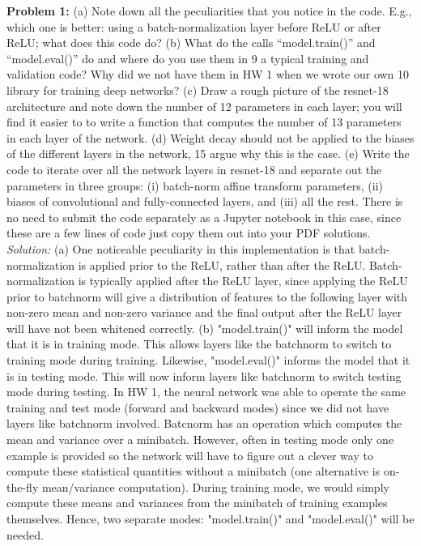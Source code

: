 \documentclass[12pt]{article}
\begin{document}
\maketitle


\textbf{Problem 1:}  \newline 
(a) Note down all the peculiarities that you notice in the code. E.g., which one is better: using a batch-normalization layer before ReLU or after ReLU; what does this code do? \newline 
(b) What do the calls “model.train()” and “model.eval()” do and where do you use them in 9 a typical training and validation code? Why did we not have them in HW 1 when we wrote our own 10 library for training deep networks? \newline 
(c) Draw a rough picture of the resnet-18 architecture and note down the number of 12 parameters in each layer; you will find it easier to to write a function that computes the number of 13 parameters in each layer of the network.\newline 
(d) Weight decay should not be applied to the biases of the different layers in the network, 15 argue why this is the case. \newline 
(e) Write the code to iterate over all the network layers in resnet-18 and separate out the  parameters in three groups: (i) batch-norm affine transform parameters, (ii) biases of convolutional and fully-connected layers, and (iii) all the rest. There is no need to submit the code separately as a Jupyter notebook in this case, since these are a few lines of code just copy them out into your PDF  solutions.
\newline \newline 
\emph{Solution: } \newline   \newline 
(a) One noticeable peculiarity in this implementation is that batch-normalization is applied prior to the ReLU, rather than after the ReLU.  Batch-normalization is typically applied after the ReLU layer, since applying the ReLU prior to batchnorm will give a distribution of features to the following layer with non-zero mean and non-zero variance and the final output after the ReLU layer will have not been whitened correctly.   \newline \newline 
(b) "model.train()" will inform the model that it is in training mode.  This allows layers like the batchnorm to switch to training mode during training. Likewise, "model.eval()"  informs the model that it is in testing mode. This will now inform layers like batchnorm to switch testing mode during testing. In HW 1, the neural network was able to operate the same training and test mode (forward and backward modes) since we did not have layers like batchnorm involved. Batcnorm has an operation which computes the mean and variance over a minibatch. However, often in testing mode only one example is provided so the network will have to figure out a clever way to compute these statistical quantities without a minibatch (one alternative is on-the-fly mean/variance computation). During training mode, we would simply compute these means and variances from the minibatch of training examples themselves. Hence, two separate modes: "model.train()" and "model.eval()" will be needed. 
\end{document}
